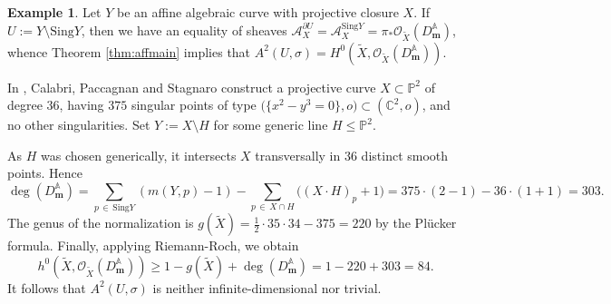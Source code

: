\documentclass[11pt]{amsart}
\theoremstyle{definition}
\newtheorem{example}[theorem]{Example}
\newcommand{\bC}{{\mathbb C}}
\begin{document}
\begin{example}
    Let $Y$ be an affine algebraic curve with projective closure $X$. If $U:= Y \setminus \text{Sing}Y$, then we have an equality of sheaves $\mathcal{A}_X^{\partial U} = \mathcal{A}_X^{\text{Sing}Y}=\pi_*\mathcal{O}_{\widetilde{X}}(D_\mathbf{m}^\mathbb{A})$, whence Theorem \ref{thm:affmain} implies that $A^2(U,\sigma) = H^0(\widetilde{X},\mathcal{O}_{\widetilde{X}}(D_\mathbf{m}^\mathbb{A}))$.

    In \cite{CPS14}, Calabri, Paccagnan and Stagnaro construct a projective curve $X \subset \mathbb{P}^2$ of degree $36$, having $375$ singular points of type $\big(\{x^2-y^3=0\},o\big) \subset (\bC^2,o)$, and no other singularities. Set $Y := X \setminus H$ for some generic line $H \leq \mathbb{P}^2$.

    As $H$ was chosen generically, it intersects $X$ transversally in $36$ distinct smooth points. Hence $$\deg(D_\mathbf{m}^\mathbb{A}) = \sum_{p \, \in \, \text{Sing}Y}( m(Y,p)-1)- \sum_{p\,\in\,X\cap H}\big( (X\cdot H)_p+1\big) = 375\cdot(2-1) -36\cdot(1+1)=303.$$
    The genus of the normalization is $g(\widetilde{X})=\frac{1}{2}\cdot 35 \cdot 34 -375 = 220$ by the Plücker formula. Finally, applying Riemann-Roch, we obtain
    $$h^0(\widetilde{X},\mathcal{O}_{\widetilde{X}}(D_\mathbf{m}^\mathbb{A})) \geq 1-g(\widetilde{X}) + \deg(D_\mathbf{m}^\mathbb{A}) = 1-220+303 = 84.$$
    It follows that $A^2(U,\sigma)$ is neither infinite-dimensional nor trivial.
    
\end{example}
\end{document}
